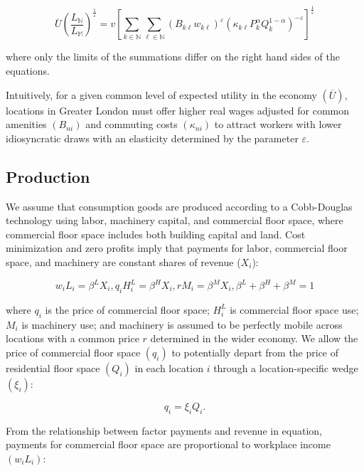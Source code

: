 \begin{equation}
    \overline{U}(\frac{L_{\mathbb{N}}}{L_{\mathbb{M}}})^{\frac{1}{\varepsilon}} = v\left[ \sum_{k \in \mathbb{N}} \sum_{\ell \in \mathbb{N}} (B_{k\ell} w_{k\ell})^{\varepsilon} (\kappa_{k\ell} P_k^{\alpha} Q_k^{1 - \alpha})^{-\varepsilon} \right]^{\frac{1}{\varepsilon}}
\end{equation}

where only the limits of the summations differ on the right hand sides of the equations.

Intuitively, for a given common level of expected utility in the economy $(\overline{U})$, locations in Greater London must offer higher real wages adjusted for common amenities $(B_{ni})$ and commuting costs $(\kappa_{ni})$ to attract workers with lower idiosyncratic draws with an elasticity determined by the parameter $\varepsilon$.

\subsection{Production}

We assume that consumption goods are produced according to a Cobb-Douglas technology using labor, machinery capital, and commercial floor space, where commercial floor space includes both building capital and land. Cost minimization and zero profits imply that payments for labor, commercial floor space, and machinery are constant shares of revenue ($X_i$):

\begin{equation}
    w_i L_i = \beta^L X_i, q_i H_i^L = \beta^H X_i, rM_i = \beta^M X_i, \beta^L + \beta^H + \beta^M = 1
\end{equation}

where $q_i$ is the price of commercial floor space; $H_i^L$ is commercial floor space use; $M_i$ is machinery use; and machinery is assumed to be perfectly mobile across locations with a common price $r$ determined in the wider economy. We allow the price of commercial floor space $(q_i)$ to potentially depart from the price of residential floor space $(Q_i)$ in each location $i$ through a location-specific wedge $(\xi_i)$:

\begin{equation}
    q_i = \xi_i Q_i.
\end{equation}

From the relationship between factor payments and revenue in equation, payments for commercial floor space are proportional to workplace income $(w_i L_i)$:

